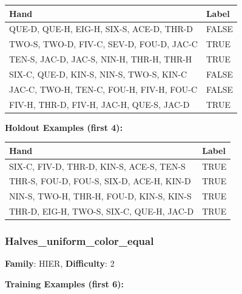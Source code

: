 \documentclass[10pt,a4paper]{article}
\begin{document}
\begin{small}
\begin{tabular}{p{8cm}l}
\toprule
Hand & Label \\
\midrule
QUE-D, QUE-H, EIG-H, SIX-S, ACE-D, THR-D & \textcolor{negative}{FALSE} \\
TWO-S, TWO-D, FIV-C, SEV-D, FOU-D, JAC-C & \textcolor{positive}{TRUE} \\
TEN-S, JAC-D, JAC-S, NIN-H, THR-H, THR-H & \textcolor{positive}{TRUE} \\
SIX-C, QUE-D, KIN-S, NIN-S, TWO-S, KIN-C & \textcolor{negative}{FALSE} \\
JAC-C, TWO-H, TEN-C, FOU-H, FIV-H, FOU-C & \textcolor{negative}{FALSE} \\
FIV-H, THR-D, FIV-H, JAC-H, QUE-S, JAC-D & \textcolor{positive}{TRUE} \\
\bottomrule
\end{tabular}
\end{small}

\textbf{Holdout Examples (first 4):}

\begin{small}
\begin{tabular}{p{8cm}l}
\toprule
Hand & Label \\
\midrule
SIX-C, FIV-D, THR-D, KIN-S, ACE-S, TEN-S & \textcolor{positive}{TRUE} \\
THR-S, FOU-D, FOU-S, SIX-D, ACE-H, KIN-D & \textcolor{positive}{TRUE} \\
NIN-S, TWO-H, THR-H, FOU-D, KIN-S, KIN-S & \textcolor{positive}{TRUE} \\
THR-D, EIG-H, TWO-S, SIX-C, QUE-H, JAC-D & \textcolor{positive}{TRUE} \\
\bottomrule
\end{tabular}
\end{small}

\vspace{0.5cm}

\subsubsection{Halves\_uniform\_color\_equal}

\textbf{Family}: HIER, \textbf{Difficulty}: 2

\textbf{Training Examples (first 6):}
\end{document}
